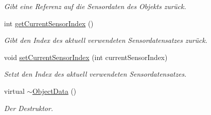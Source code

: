 \begin{DoxyCompactItemize}
\begin{DoxyCompactList}\small\item\em Gibt eine Referenz auf die Sensordaten des Objekts zurück. \end{DoxyCompactList}\item 
int \hyperlink{classObjectData_a503d63160a3afe2ea517449f78f8ac42}{get\-Current\-Sensor\-Index} ()
\begin{DoxyCompactList}\small\item\em Gibt den Index des aktuell verwendeten Sensordatensatzes zurück. \end{DoxyCompactList}\item 
void \hyperlink{classObjectData_a65bc706c460a62f98e6c24959df04c76}{set\-Current\-Sensor\-Index} (int current\-Sensor\-Index)
\begin{DoxyCompactList}\small\item\em Setzt den Index des aktuell verwendeten Sensordatensatzes. \end{DoxyCompactList}\item 
virtual \hyperlink{classObjectData_a4f6cd4abd0993621e996c0a2d374c0e6}{$\sim$\-Object\-Data} ()
\begin{DoxyCompactList}\small\item\em Der Destruktor. \end{DoxyCompactList}\end{DoxyCompactItemize}
